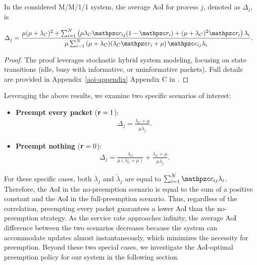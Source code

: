 \begin{Theorem}\label{The1}
In the considered M/M/1/1 system, the average AoI for process $j$, denoted as $\Delta_j$, is

\footnotesize
\begin{align}
\Delta_j= \frac{\mu(\mu+\lambda_C)^2 + \sum_{i=1}^{N} \left(\mu\lambda_C \nc_{ij}(1-\np_{i}) + (\mu + \lambda_C)^2\np_{i}\right)\lambda_{i}}{
        \mu \sum_{i=1}^{N} \left(\mu + \lambda_C)(\lambda_C \np_{i} + \mu \right) \nc_{ij}\lambda_{i}}.
    \end{align}
\normalsize
    \end{Theorem}
\begin{proof} The proof leverages stochastic hybrid system modeling, focusing on state transitions (idle, busy with informative, or uninformative packets). Full details are provided in 
{Appendix~\ref{aoi-appendix}}
{Appendix C in \cite{technicalNote}}. 
\end{proof}
Leveraging the above results, we examine two specific scenarios of interest:
\begin{itemize}

    \item \textbf{Preempt every packet} (\( \mathbf{r} = 1 \)):
    \begin{align}
    \Delta_j = \frac{{\lambda}_C+\mu}{\mu \tilde{\lambda}_j} .
    \end{align}
    
    \item \textbf{Preempt nothing} (\( \mathbf{r} = 0 \)):
    \begin{align}
    \Delta_j = \frac{{\lambda}_C}{\mu ({\lambda}_C + \mu)} + \frac{{\lambda}_C + \mu}{\mu \dot{\lambda}_j}.
    \end{align}


\end{itemize}


For these specific cases, both $\dot{\lambda}_j$ and $\tilde{\lambda}_j$ are equal to $\sum_{i=1}^{N} \nc_{ij}\lambda_i$. Therefore, the AoI in the no-preemption scenario is equal to the sum of a positive constant and the AoI in the full-preemption scenario. Thus, regardless of the correlation, preempting every packet guarantees a lower AoI than the no-preemption strategy. As the service rate approaches infinity, the average AoI difference between the two scenarios decreases because the system can accommodate updates almost instantaneously, which minimizes the necessity for preemption. Beyond these two special cases, we investigate the AoI-optimal preemption policy for our system in the following section.

